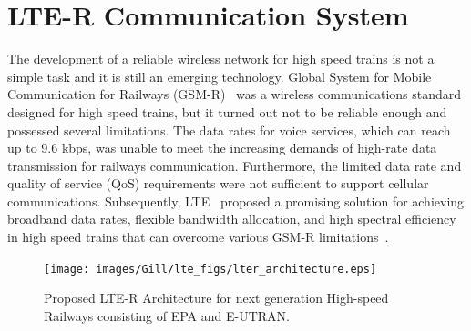 \section{LTE-R Communication System}

The development of a reliable wireless network for high speed trains is not a simple task and it is still an emerging technology. Global System for Mobile Communication for Railways (GSM-R)~\cite{trlter1} was a wireless communications standard designed for high speed trains, but it turned out not to be reliable enough and possessed several limitations. The data rates for voice services, which can reach up to 9.6 kbps, was unable to meet the increasing demands of high-rate data transmission for railways communication. Furthermore, the limited data rate and quality of service (QoS) requirements were not sufficient to support cellular communications. Subsequently, LTE~\cite{trlter2} proposed a promising solution for achieving broadband data rates, flexible bandwidth allocation, and high spectral efficiency in high speed trains that can overcome various GSM-R limitations~\cite{arlter3,inplter4}.

\begin{figure}[!ht]
\centering
\texttt{[image: images/Gill/lte\_figs/lter\_architecture.eps]} 
\caption{Proposed LTE-R Architecture for next generation High-speed Railways consisting of EPA and E-UTRAN.}
\label{ltearch}
\end{figure}

